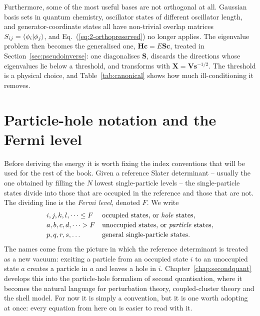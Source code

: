 Furthermore, some of the most useful bases are not orthogonal at all.
Gaussian basis sets in quantum chemistry, oscillator states of different
oscillator length, and generator-coordinate states all have non-trivial
overlap matrices $S_{ij}=\langle \phi_i \vert \phi_j \rangle$, and
Eq.~(\ref{eq:2-orthopreserved}) no longer applies.  The eigenvalue problem
then becomes the generalised one,
$\bm{H}\bm{c}=E\bm{S}\bm{c}$, treated in Section~\ref{sec:pseudoinverse}: one
diagonalises $\bm{S}$, discards the directions whose eigenvalues lie below a
threshold, and transforms with $\bm{X}=\bm{V}\bm{s}^{-1/2}$.  The threshold is
a physical choice, and Table~\ref{tab:canonical} shows how much
ill-conditioning it removes.

\section{Particle-hole notation and the Fermi level}
\label{sec:particlehole}

Before deriving the energy it is worth fixing the index conventions that will
be used for the rest of the book.  Given a reference Slater determinant --
usually the one obtained by filling the $N$ lowest single-particle levels --
the single-particle states divide into those that are occupied in the
reference and those that are not.  The dividing line is the \emph{Fermi
level}, denoted $F$.  We write
\begin{equation}
  \begin{array}{ll}
    i,j,k,l,\dots \le F & \text{occupied states, or \emph{hole} states},\\[2pt]
    a,b,c,d,\dots > F   & \text{unoccupied states, or \emph{particle} states},\\[2pt]
    p,q,r,s,\dots       & \text{general single-particle states.}
  \end{array}
  \label{eq:2-phnotation}
\end{equation}
The names come from the picture in which the reference determinant is treated
as a new vacuum: exciting a particle from an occupied state $i$ to an
unoccupied state $a$ creates a particle in $a$ and leaves a hole in $i$.
Chapter~\ref{chap:secondquant} develops this into the particle-hole formalism
of second quantisation, where it becomes the natural language for
perturbation theory, coupled-cluster theory and the shell model.  For now it
is simply a convention, but it is one worth adopting at once: every equation
from here on is easier to read with it.

